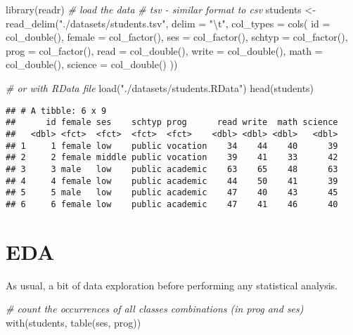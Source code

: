 \documentclass[
  oneside]{book}
\newenvironment{Shaded}{\begin{snugshade}}{\end{snugshade}}
\newcommand{\AttributeTok}[1]{\textcolor[rgb]{0.77,0.63,0.00}{#1}}
\newcommand{\CommentTok}[1]{\textcolor[rgb]{0.56,0.35,0.01}{\textit{#1}}}
\newcommand{\FunctionTok}[1]{\textcolor[rgb]{0.00,0.00,0.00}{#1}}
\newcommand{\NormalTok}[1]{#1}
\newcommand{\OtherTok}[1]{\textcolor[rgb]{0.56,0.35,0.01}{#1}}
\newcommand{\SpecialCharTok}[1]{\textcolor[rgb]{0.00,0.00,0.00}{#1}}
\newcommand{\StringTok}[1]{\textcolor[rgb]{0.31,0.60,0.02}{#1}}
\begin{document}
\begin{Shaded}
\begin{Highlighting}[]
\FunctionTok{library}\NormalTok{(readr)}
\CommentTok{\# load the data}
\CommentTok{\# tsv {-} similar format to csv}
\NormalTok{students }\OtherTok{\textless{}{-}} \FunctionTok{read\_delim}\NormalTok{(}\StringTok{"./datasets/students.tsv"}\NormalTok{, }\AttributeTok{delim =} \StringTok{"}\SpecialCharTok{\textbackslash{}t}\StringTok{"}\NormalTok{, }\AttributeTok{col\_types =} \FunctionTok{cols}\NormalTok{(}
  \AttributeTok{id =} \FunctionTok{col\_double}\NormalTok{(),}
  \AttributeTok{female =} \FunctionTok{col\_factor}\NormalTok{(),}
  \AttributeTok{ses =} \FunctionTok{col\_factor}\NormalTok{(),}
  \AttributeTok{schtyp =} \FunctionTok{col\_factor}\NormalTok{(),}
  \AttributeTok{prog =} \FunctionTok{col\_factor}\NormalTok{(),}
  \AttributeTok{read =} \FunctionTok{col\_double}\NormalTok{(),}
  \AttributeTok{write =} \FunctionTok{col\_double}\NormalTok{(),}
  \AttributeTok{math =} \FunctionTok{col\_double}\NormalTok{(),}
  \AttributeTok{science =} \FunctionTok{col\_double}\NormalTok{()}
\NormalTok{))}

\CommentTok{\# or with RData file}
\FunctionTok{load}\NormalTok{(}\StringTok{"./datasets/students.RData"}\NormalTok{)}
\FunctionTok{head}\NormalTok{(students)}
\end{Highlighting}
\end{Shaded}

\begin{verbatim}
## # A tibble: 6 x 9
##      id female ses    schtyp prog      read write  math science
##   <dbl> <fct>  <fct>  <fct>  <fct>    <dbl> <dbl> <dbl>   <dbl>
## 1     1 female low    public vocation    34    44    40      39
## 2     2 female middle public vocation    39    41    33      42
## 3     3 male   low    public academic    63    65    48      63
## 4     4 female low    public academic    44    50    41      39
## 5     5 male   low    public academic    47    40    43      45
## 6     6 female low    public academic    47    41    46      40
\end{verbatim}

\hypertarget{eda}{%
\section{EDA}\label{eda}}

As usual, a bit of data exploration before performing any statistical
analysis.

\begin{Shaded}
\begin{Highlighting}[]
\CommentTok{\# count the occurrences of all classes combinations (in prog and ses)}
\FunctionTok{with}\NormalTok{(students, }\FunctionTok{table}\NormalTok{(ses, prog))}
\end{Highlighting}
\end{Shaded}
\end{document}
